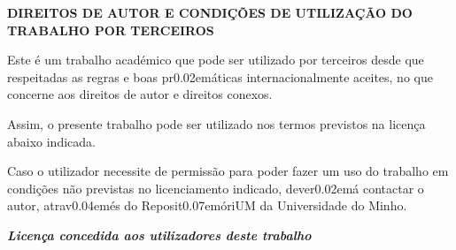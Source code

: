 
\centerline{\textbf{DIREITOS DE AUTOR E CONDIÇÕES DE UTILIZAÇÃO DO TRABALHO POR TERCEIROS}}

\bigskip

\bigskip

\noindent Este é um trabalho académico que pode ser utilizado por terceiros desde que respeitadas as regras e boas pr\kern0.02emáticas internacionalmente aceites, no que concerne aos direitos de autor e direitos conexos.

\noindent Assim, o presente trabalho pode ser utilizado nos termos previstos na licença abaixo indicada.

\noindent Caso o utilizador necessite de permissão para poder fazer um uso do trabalho em condições não previstas no licenciamento indicado, dever\kern0.02emá contactar o autor, atrav\kern0.04emés do Reposit\kern0.07emóriUM da Universidade do Minho.


\noindent \textit{\textbf{Licença concedida aos utilizadores deste trabalho}}

\bigskip

\bigskip

{




}


